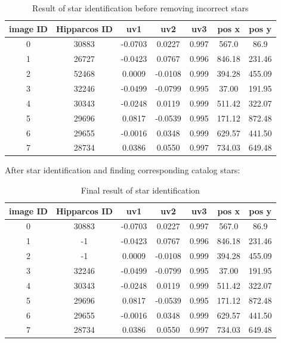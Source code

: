 \documentclass[12pt,a4paper,oneside]{article}
\begin{document}
\renewcommand{\arraystretch}{1.5}
\begin{table}[!htbp]
\centering
\begin{tabular}{|c|c|c|c|c|c|c|}
\hline 
image ID & Hipparcos ID & uv1 & uv2 & uv3 & pos x & pos y \\ 
\hline 
0 &  30883 & -0.0703 &  0.0227 & 0.997 &  567.0 &  86.9 \\
\hline 
1 &  26727 & -0.0423 &  0.0767 & 0.996 &  846.18 &  231.46 \\
\hline 
2 &  52468 &  0.0009 & -0.0108 & 0.999 &  394.28 &  455.09 \\
\hline 
3 &  32246 & -0.0499 & -0.0799 & 0.995 &  37.00 &  191.95 \\
\hline 
4 &  30343 & -0.0248 &  0.0119 & 0.999 &  511.42 &  322.07 \\
\hline 
5 &  29696 &  0.0817 & -0.0539 & 0.995 &  171.12 &  872.48 \\
\hline 
6 &  29655 & -0.0016 &  0.0348 & 0.999 &  629.57 &  441.50 \\
\hline 
7 &  28734 & 0.0386 & 0.0550 & 0.997 & 734.03 & 649.48 \\
\hline 
\end{tabular}
\caption{Result of star identification before removing incorrect stars}
\label{tab:example_4}
\end{table}


After star identification and finding corresponding catalog stars:

\renewcommand{\arraystretch}{1.5}
\begin{table}[!htbp]
\centering
\begin{tabular}{|c|c|c|c|c|c|c|}
\hline 
image ID & Hipparcos ID & uv1 & uv2 & uv3 & pos x & pos y \\ 
\hline 
0 &  30883 & -0.0703 &  0.0227 & 0.997 &  567.0 &  86.9 \\
\hline 
1 & -1 & -0.0423 &  0.0767 & 0.996 &  846.18 &  231.46 \\
\hline 
2 & -1 &  0.0009 & -0.0108 & 0.999 &  394.28 &  455.09 \\
\hline 
3 &  32246 & -0.0499 & -0.0799 & 0.995 &  37.00 &  191.95 \\
\hline 
4 &  30343 & -0.0248 &  0.0119 & 0.999 &  511.42 &  322.07 \\
\hline 
5 &  29696 &  0.0817 & -0.0539 & 0.995 &  171.12 &  872.48 \\
\hline 
6 &  29655 & -0.0016 &  0.0348 & 0.999 &  629.57 &  441.50 \\
\hline 
7 &  28734 & 0.0386 & 0.0550 & 0.997 & 734.03 & 649.48 \\
\hline 
\end{tabular}
\caption{Final result of star identification}
\label{tab:example_5}
\end{table}
\end{document}
